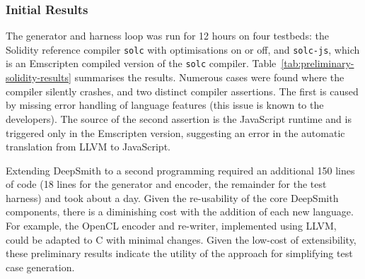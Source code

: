 \subsubsection{Initial Results}

The generator and harness loop was run for 12 hours on four testbeds: the Solidity reference compiler \texttt{solc} with optimisations on or off, and \texttt{solc-js}, which is an Emscripten compiled version of the \texttt{solc} compiler. Table~\ref{tab:preliminary-solidity-results} summarises the results. Numerous cases were found where the compiler silently crashes, and two distinct compiler assertions. The first is caused by missing error handling of language features (this issue is known to the developers). The source of the second assertion is the JavaScript runtime and is triggered only in the Emscripten version, suggesting an error in the automatic translation from LLVM to JavaScript.

Extending DeepSmith to a second programming required an additional 150 lines of code (18 lines for the generator and encoder, the remainder for the test harness) and took about a day. Given the re-usability of the core DeepSmith components, there is a diminishing cost with the addition of each new language. For example, the OpenCL encoder and re-writer, implemented using LLVM, could be adapted to C with minimal changes. Given the low-cost of extensibility, these preliminary results indicate the utility of the approach for simplifying test case generation.

